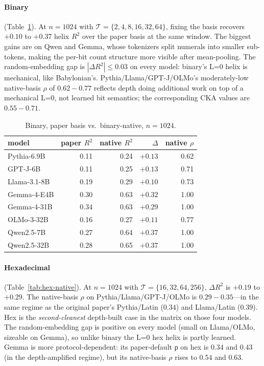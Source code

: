 \documentclass[10pt,letterpaper]{article}
\begin{document}
\paragraph{Binary} (Table~\ref{tab:binary-native}). At $n=1024$ with
$\mathcal{T} = \{2,4,8,16,32,64\}$, fixing the basis recovers
$+0.10$ to $+0.37$ helix $R^2$ over the paper basis at the same
window. The biggest gains are on Qwen and Gemma, whose tokenizers
split numerals into smaller sub-tokens, making the per-bit count
structure more visible after mean-pooling. The random-embedding
gap is $|\Delta R^2| \le 0.03$ on every model: binary's L=0 helix
is mechanical, like Babylonian's. Pythia/Llama/GPT-J/OLMo's
moderately-low native-basis $\rho$ of $0.62{-}0.77$ reflects depth
doing additional work on top of a mechanical L=0, not learned bit
semantics; the corresponding CKA values are $0.55{-}0.71$.

\begin{table}[h]
\caption{Binary, paper basis vs.\ binary-native, $n=1024$.}
\label{tab:binary-native}
\centering
\small
\begin{tabular}{lrrrr}
\toprule
model & paper $R^2$ & native $R^2$ & $\Delta$ & native $\rho$ \\
\midrule
Pythia-6.9B    & 0.11 & 0.24 & $+0.13$ & 0.62 \\
GPT-J-6B       & 0.11 & 0.25 & $+0.13$ & 0.71 \\
Llama-3.1-8B   & 0.19 & 0.29 & $+0.10$ & 0.73 \\
Gemma-4-E4B    & 0.30 & 0.63 & $+0.32$ & 1.00 \\
Gemma-4-31B    & 0.34 & 0.63 & $+0.29$ & 1.00 \\
OLMo-3-32B     & 0.16 & 0.27 & $+0.11$ & 0.77 \\
Qwen2.5-7B     & 0.27 & 0.64 & $+0.37$ & 1.00 \\
Qwen2.5-32B    & 0.28 & 0.65 & $+0.37$ & 1.00 \\
\bottomrule
\end{tabular}
\end{table}

\paragraph{Hexadecimal} (Table~\ref{tab:hex-native}). At $n=1024$
with $\mathcal{T} = \{16,32,64,256\}$, $\Delta R^2$ is $+0.19$ to
$+0.29$. The native-basis $\rho$ on Pythia/Llama/GPT-J/OLMo is
$0.29{-}0.35$---in the same regime as the original paper's
Pythia/Latin ($0.34$) and Llama/Latin ($0.39$). Hex is the
\emph{second-cleanest} depth-built case in the matrix on those
four models. The random-embedding gap is positive on every model
(small on Llama/OLMo, sizeable on Gemma), so unlike binary the L=0
hex helix is partly learned. Gemma is more protocol-dependent: its
paper-default ρ on hex is $0.34$ and $0.43$ (in the depth-amplified
regime), but its native-basis $\rho$ rises to $0.54$ and $0.63$.
\end{document}
